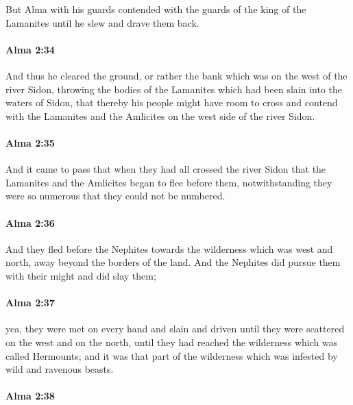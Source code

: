 			But Alma with his guards contended with the guards of the king of the Lamanites
			until he slew and drave them back.

		\paragraph{Alma 2:34} %
			\label{ALMA-2-34}

			And thus he cleared the ground,
			or rather the bank which was on the west of the river Sidon,
			throwing the bodies of the Lamanites which had been slain
			into the waters of Sidon,
			that thereby his people might have room to cross
			and contend with the Lamanites and the Amlicites
			on the west side of the river Sidon.

		\paragraph{Alma 2:35} %
			\label{ALMA-2-35}

			And it came to pass that when they had all crossed the river Sidon
			that the Lamanites and the Amlicites began to flee before them,
			notwithstanding they were so numerous that they could not be numbered.

		\paragraph{Alma 2:36} %
			\label{ALMA-2-36}

			And they fled before the Nephites
			towards the wilderness which was west and north,
			away beyond the borders of the land.
			And the Nephites did pursue them with their might and did slay them;

		\paragraph{Alma 2:37} %
			\label{ALMA-2-37}

			yea, they were met on every hand and slain and driven
			until they were scattered on the west and on the north,
			until they had reached the wilderness which was called Hermounts;
			and it was that part of the wilderness
			which was infested by wild and ravenous beasts.

		\paragraph{Alma 2:38} %
			\label{ALMA-2-38}


